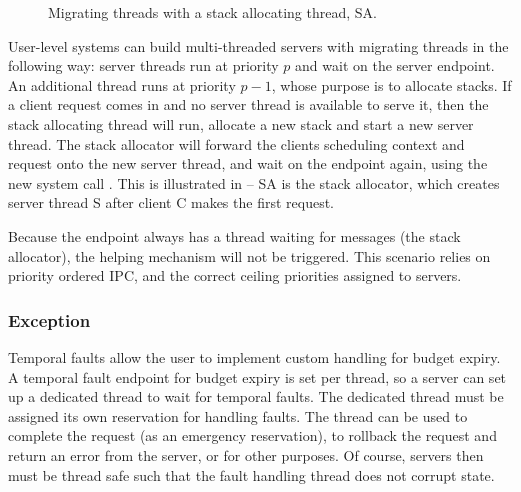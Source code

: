 \begin{figure}
    \centering
    \caption{Migrating threads with a stack allocating thread, SA.}
    \label{fig:migrating-threads}
\end{figure}

User-level systems can build multi-threaded servers with migrating threads in the following way: server threads run at priority $p$ and wait on the server endpoint.
An additional thread runs at priority $p - 1$, whose purpose is to allocate stacks.
If a client request comes in and no server thread is available to serve it, then the stack allocating thread will run, allocate a new stack and start a new server thread.
The stack allocator will forward the clients scheduling context and request onto the new server thread, and wait on the endpoint again, using the new system call \sendwait.
This is illustrated in  -- SA is the stack allocator, which creates server thread S after client C makes the first request.

Because the endpoint always has a thread waiting for messages (the stack allocator), the helping mechanism will not be triggered.
This scenario relies on priority ordered \gls{IPC}, and the correct ceiling priorities assigned to servers.

\subsubsection{Exception}

Temporal faults allow the user to implement custom handling for budget expiry.
A temporal fault endpoint for budget expiry is set per thread, so a server can set up a dedicated thread to wait for temporal faults.
The dedicated thread must be assigned its own reservation for handling faults.
The thread can be used to complete the request (as an emergency reservation), to rollback the request and return an error from the server, or for other purposes.
Of course, servers then must be thread safe such that the fault handling thread does not corrupt state.

